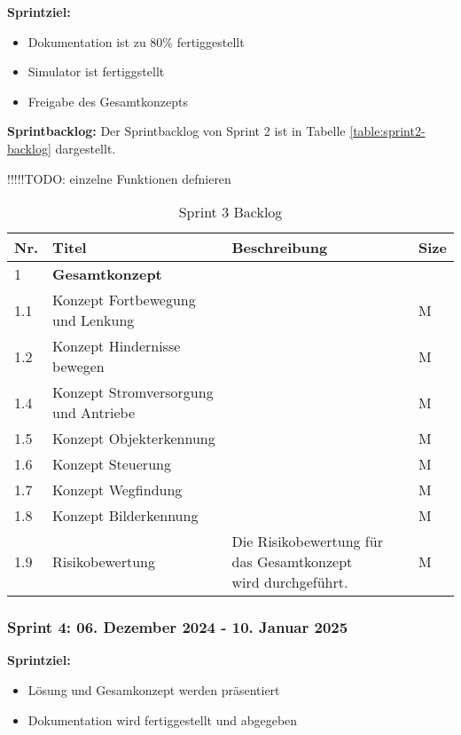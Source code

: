 \textbf{Sprintziel:}
\begin{itemize}
    \item Dokumentation ist zu 80\% fertiggestellt
    \item Simulator ist fertiggstellt
    \item Freigabe des Gesamtkonzepts
\end{itemize}

\textbf{Sprintbacklog:} Der Sprintbacklog von Sprint 2 ist in Tabelle \ref{table:sprint2-backlog} dargestellt.

!!!!!TODO: einzelne Funktionen defnieren

\begin{table}[H]
\centering
\small
\begin{tabular}{|l|l|l| l|}
\hline
  \textbf{Nr.} & \textbf{Titel} & \textbf{Beschreibung} & \textbf{Size}\\
  \hline
  1  & \textbf{Gesamtkonzept} &&\\
  \hline
  1.1  & Konzept Fortbewegung und Lenkung & & M\\
    \hline
  \hline
  1.2 & Konzept Hindernisse bewegen && M\\
  \hline
  1.4 & Konzept Stromversorgung und Antriebe &  & M\\
  \hline
  1.5 & Konzept Objekterkennung &  & M\\
  \hline
  1.6 & Konzept Steuerung &  & M\\
  \hline
    1.7 & Konzept Wegfindung &  & M\\
\hline
    1.8 & Konzept Bilderkennung &  & M\\
\hline
  1.9    & Risikobewertung & \makecell{Die Risikobewertung für das Gesamtkonzept\\ wird durchgeführt.}& M \\
  \hline 
\end{tabular}
\caption{Sprint 3 Backlog}
\label{table:sprint3-backlog}
\end{table}

\newpage
\subsubsection{Sprint 4: 06. Dezember 2024 - 10. Januar 2025}

\textbf{Sprintziel:}
\begin{itemize}
    \item Lösung und Gesamkonzept werden präsentiert
    \item Dokumentation wird fertiggestellt und abgegeben
\end{itemize}

